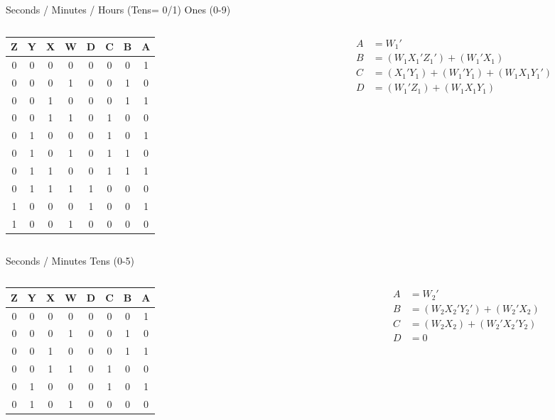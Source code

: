 \documentclass{beamer}
\begin{document}
\begin{frame}{Seconds / Minutes / Hours (Tens= 0/1) Ones (0-9)}
\begin{columns}
\begin{column}{0.5\textwidth}
\centering
\begin{tabular}{|c|c|c|c||c|c|c|c|}
\hline
Z & Y & X & W & D & C & B & A\\
\hline
0&0&0&0&0&0&0&1\\
0&0&0&1&0&0&1&0\\
0&0&1&0&0&0&1&1\\
0&0&1&1&0&1&0&0\\
0&1&0&0&0&1&0&1\\
0&1&0&1&0&1&1&0\\
0&1&1&0&0&1&1&1\\
0&1&1&1&1&0&0&0\\
1&0&0&0&1&0&0&1\\
1&0&0&1&0&0&0&0\\
\hline
\end{tabular}
\end{column}
\begin{column}{0.5\textwidth}
\begin{align*}
A &= W_1'\\
B &= (W_1 X_1' Z_1') + (W_1' X_1)\\
C &= (X_1' Y_1) + (W_1' Y_1) + (W_1 X_1 Y_1')\\
D &= (W_1' Z_1) + (W_1 X_1 Y_1)
\end{align*}
\end{column}
\end{columns}
\end{frame}

\begin{frame}{Seconds / Minutes Tens (0-5)}
\begin{columns}
\begin{column}{0.5\textwidth}
\centering
\begin{tabular}{|c|c|c|c||c|c|c|c|}
\hline
Z & Y & X & W & D & C & B & A\\
\hline
0&0&0&0&0&0&0&1\\
0&0&0&1&0&0&1&0\\
0&0&1&0&0&0&1&1\\
0&0&1&1&0&1&0&0\\
0&1&0&0&0&1&0&1\\
0&1&0&1&0&0&0&0\\
\hline
\end{tabular}
\end{column}
\begin{column}{0.5\textwidth}
\begin{align*}
A &= W_2'\\
B &= (W_2 X_2' Y_2') + (W_2' X_2)\\
C &= (W_2 X_2) + (W_2' X_2' Y_2)\\
D &= 0
\end{align*}
\end{column}
\end{columns}
\end{frame}
\end{document}
